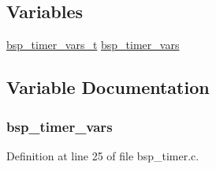 \subsection*{Variables}
\begin{DoxyCompactItemize}
\item 
\hyperlink{structbsp__timer__vars__t}{bsp\+\_\+timer\+\_\+vars\+\_\+t} \hyperlink{ez430-rf2500_2bsp__timer_8c_a2c30c3f080deb67f34bab3e451c4aba9}{bsp\+\_\+timer\+\_\+vars}
\end{DoxyCompactItemize}


\subsection{Variable Documentation}
\subsubsection[{\texorpdfstring{bsp\+\_\+timer\+\_\+vars}{bsp_timer_vars}}]{ bsp\+\_\+timer\+\_\+vars}\hypertarget{ez430-rf2500_2bsp__timer_8c_a2c30c3f080deb67f34bab3e451c4aba9}{}\label{ez430-rf2500_2bsp__timer_8c_a2c30c3f080deb67f34bab3e451c4aba9}


Definition at line 25 of file bsp\+\_\+timer.\+c.

